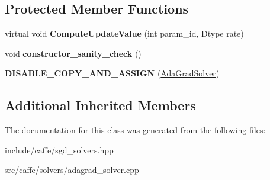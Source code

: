 \subsection*{Protected Member Functions}
\begin{DoxyCompactItemize}
\item 
virtual void {\bfseries Compute\+Update\+Value} (int param\+\_\+id, Dtype rate)\hypertarget{classcaffe_1_1AdaGradSolver_adbe3471f5f75aa3b8642e1eaca7ef73f}{}\label{classcaffe_1_1AdaGradSolver_adbe3471f5f75aa3b8642e1eaca7ef73f}

\item 
void {\bfseries constructor\+\_\+sanity\+\_\+check} ()\hypertarget{classcaffe_1_1AdaGradSolver_a5c6e3d55dfde5836d9b37cbe7b9640e8}{}\label{classcaffe_1_1AdaGradSolver_a5c6e3d55dfde5836d9b37cbe7b9640e8}

\item 
{\bfseries D\+I\+S\+A\+B\+L\+E\+\_\+\+C\+O\+P\+Y\+\_\+\+A\+N\+D\+\_\+\+A\+S\+S\+I\+GN} (\hyperlink{classcaffe_1_1AdaGradSolver}{Ada\+Grad\+Solver})\hypertarget{classcaffe_1_1AdaGradSolver_a1ff1971832c3ed6971c07e48dfd94b78}{}\label{classcaffe_1_1AdaGradSolver_a1ff1971832c3ed6971c07e48dfd94b78}

\end{DoxyCompactItemize}
\subsection*{Additional Inherited Members}


The documentation for this class was generated from the following files\+:\begin{DoxyCompactItemize}
\item 
include/caffe/sgd\+\_\+solvers.\+hpp\item 
src/caffe/solvers/adagrad\+\_\+solver.\+cpp\end{DoxyCompactItemize}
